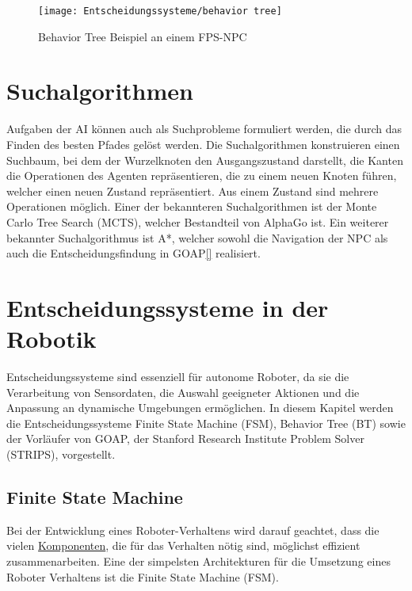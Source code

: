 \begin{figure}[h]
  \centering
  \texttt{[image: Entscheidungssysteme/behavior tree]}
	\captionsetup{justification=justified, format=plain}
  \caption{Behavior Tree Beispiel an einem FPS-NPC}
  \label{BT}
\end{figure}


\section{Suchalgorithmen}
\label{chap:monte-carlo}

Aufgaben der AI k\"{o}nnen auch als Suchprobleme formuliert werden, die durch das Finden des besten Pfades gel\"{o}st werden. Die Suchalgorithmen konstruieren einen Suchbaum, bei dem der Wurzelknoten den Ausgangszustand darstellt, die Kanten die Operationen des Agenten repr\"{a}sentieren, die zu einem neuen Knoten f\"{u}hren, welcher einen neuen Zustand repr\"{a}sentiert. Aus einem Zustand sind mehrere Operationen m\"{o}glich. Einer der bekannteren Suchalgorithmen ist der Monte Carlo Tree Search (MCTS), welcher Bestandteil von AlphaGo ist. Ein weiterer bekannter Suchalgorithmus ist A*, welcher sowohl die Navigation der NPC als auch die Entscheidungsfindung in GOAP\ref{} realisiert.

\section{Entscheidungssysteme in der Robotik}
\label{chap:robotik}

Entscheidungssysteme sind essenziell f\"{u}r autonome Roboter, da sie die Verarbeitung von Sensordaten, die Auswahl geeigneter Aktionen und die Anpassung an dynamische Umgebungen erm\"{o}glichen. In diesem Kapitel werden die Entscheidungssysteme Finite State Machine (FSM), Behavior Tree (BT) sowie der Vorl\"{a}ufer von GOAP, der Stanford Research Institute Problem Solver (STRIPS), vorgestellt.

\subsection{Finite State Machine}
\label{chap:fsm robotik}

Bei der Entwicklung eines Roboter-Verhaltens wird darauf geachtet, dass die vielen \hyperref[chap:game-objects]{Komponenten}, die f\"{u}r das Verhalten n\"{o}tig sind, m\"{o}glichst effizient zusammenarbeiten. Eine der simpelsten Architekturen f\"{u}r die Umsetzung eines Roboter Verhaltens ist die Finite State Machine (FSM).

